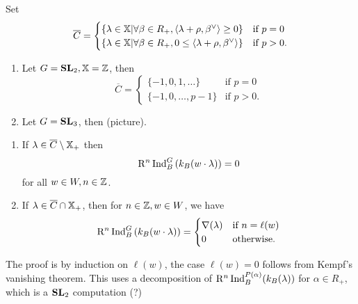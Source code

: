 	Set
	\[
		\overline{C} =
		\begin{cases}
			\left\{ \lambda\in \mathbb{X} \middle| \forall \beta\in R_+, \left<\lambda+\rho,\beta^{\vee}
			\right> \ge 0 \right\} & \text{if }p=0 \\
			\left\{ \lambda\in \mathbb{X} \middle| \forall \beta\in R_+, 0\le
			\left<\lambda+\rho,\beta^{\vee} \right> \right\} & \text{if }p>0.
		\end{cases}
	\]
	\begin{example}\leavevmode
		\begin{enumerate}[(1)]
			\item Let $G=\mathbf{SL}_2, \mathbb{X}=\mathbb Z$, then
				\[
					\overline{C} =
					\begin{cases}
						\{ -1,0,1,\dots \} & \text{if }p=0 \\
						\{ -1,0,\dots,p-1 \} & \text{if }p>0.
					\end{cases}
				\]
			\item Let $G=\mathbf{SL}_3$, then (picture).
		\end{enumerate}
	\end{example}
	\begin{theorem}\leavevmode
		\begin{enumerate}[(1)]
			\item If $\lambda\in \overline{C}\setminus \mathbb{X}_+$ then
				\[
					\mathrm{R}^{n}\operatorname{Ind}_B^{G}\left( k_B(w\cdot \lambda) \right) = 0
				\]
				for all $w\in W, n\in \mathbb Z$.
			\item If $\lambda\in \overline{C}\cap \mathbb{X}_+$, then for $n\in \mathbb Z, w\in W$, we have
				\[
					\mathrm{R}^{n}\operatorname{Ind}_B^{G}\left( k_B(w\cdot \lambda) \right) =
					\begin{cases}
						\nabla(\lambda) & \text{if }n=\ell(w) \\
						0 & \text{otherwise}.
					\end{cases}
				\]
		\end{enumerate}
	\end{theorem}
	The proof is by induction on $\ell(w)$, the case $\ell(w)=0$ follows from Kempf's
	vanishing theorem. This uses a decomposition of
	$\mathrm{R}^{n}\operatorname{Ind}_B^{P(\alpha)}(k_B(\lambda))$ for $\alpha\in R_+$, which is a $\mathbf{SL}_2$ computation (?)

